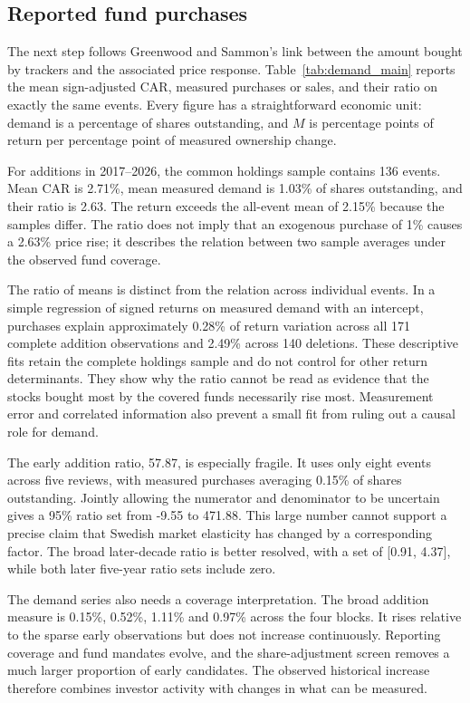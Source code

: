 \subsection{Reported fund purchases}

The next step follows Greenwood and Sammon's link between the amount bought by trackers and the associated price response. Table~\ref{tab:demand_main} reports the mean sign-adjusted CAR, measured purchases or sales, and their ratio on exactly the same events. Every figure has a straightforward economic unit: demand is a percentage of shares outstanding, and $M$ is percentage points of return per percentage point of measured ownership change.



For additions in 2017--2026, the common holdings sample contains 136 events. Mean CAR is 2.71\%, mean measured demand is 1.03\% of shares outstanding, and their ratio is 2.63. The return exceeds the all-event mean of 2.15\% because the samples differ. The ratio does not imply that an exogenous purchase of 1\% causes a 2.63\% price rise; it describes the relation between two sample averages under the observed fund coverage.

The ratio of means is distinct from the relation across individual events. In a simple regression of signed returns on measured demand with an intercept, purchases explain approximately 0.28\% of return variation across all 171 complete addition observations and 2.49\% across 140 deletions. These descriptive fits retain the complete holdings sample and do not control for other return determinants. They show why the ratio cannot be read as evidence that the stocks bought most by the covered funds necessarily rise most. Measurement error and correlated information also prevent a small fit from ruling out a causal role for demand.

The early addition ratio, 57.87, is especially fragile. It uses only eight events across five reviews, with measured purchases averaging 0.15\% of shares outstanding. Jointly allowing the numerator and denominator to be uncertain gives a 95\% ratio set from -9.55 to 471.88. This large number cannot support a precise claim that Swedish market elasticity has changed by a corresponding factor. The broad later-decade ratio is better resolved, with a set of [0.91, 4.37], while both later five-year ratio sets include zero.

The demand series also needs a coverage interpretation. The broad addition measure is 0.15\%, 0.52\%, 1.11\% and 0.97\% across the four blocks. It rises relative to the sparse early observations but does not increase continuously. Reporting coverage and fund mandates evolve, and the share-adjustment screen removes a much larger proportion of early candidates. The observed historical increase therefore combines investor activity with changes in what can be measured.

